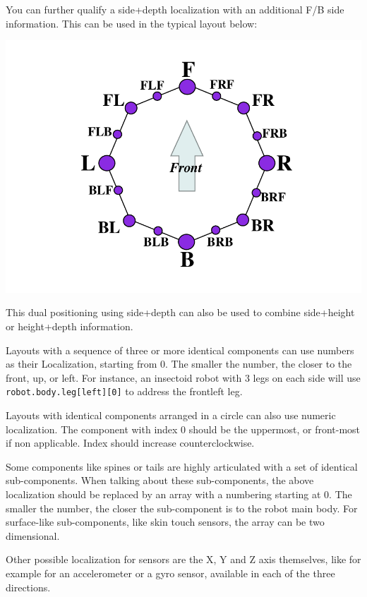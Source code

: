 You can further qualify a side+depth localization with an additional
F/B side information. This can be used in the typical layout below:

\begin{center}
  \includegraphics{img/localizer-multidim}
\end{center}

This dual positioning using side+depth can also be used to combine
side+height or height+depth information.

Layouts with a sequence of three or more identical components can use
numbers as their Localization, starting from 0.  The smaller the number, the
closer to the front, up, or left. For instance, an insectoid robot with 3
legs on each side will use \lstinline{robot.body.leg[left][0]} to address the
frontleft leg.

Layouts with identical components arranged in a circle can also use numeric
localization. The component with index 0 should be the uppermost, or
front-most if non applicable. Index should increase counterclockwise.

Some components like spines or tails are highly articulated with a set of
identical sub-components. When talking about these sub-components, the above
localization should be replaced by an array with a numbering starting at
0. The smaller the number, the closer the sub-component is to the robot main
body. For surface-like sub-components, like skin touch sensors, the array
can be two dimensional.


Other possible localization for sensors are the X, Y and Z axis
themselves, like for example for an accelerometer or a gyro sensor,
available in each of the three directions.

